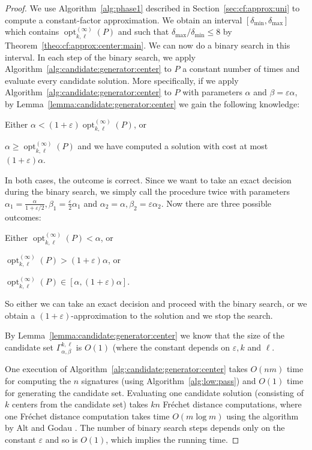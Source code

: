 \documentclass[11pt, letter]{article}
\DeclareMathOperator{\opt}{opt}
\newcommand{\secref}[1]{Section~\ref{sec:#1}}
\newcommand{\thmref}[1]{Theorem~\ref{theo:#1}}
\newcommand{\lemref}[1]{Lemma~\ref{lemma:#1}}
\newcommand{\algref}[1]{Algorithm~\ref{alg:#1}}
\newcommand{\Frechet}{Fr\'echet\xspace}
\providecommand{\eps}{{\varepsilon}}\newcommand{\Astop}{\overline{a}}
\newcommand{\nrClusters}{\ensuremath{k}}
\newcommand{\lenClusters}{\ensuremath{\ell}}
\begin{document}
\begin{proof}
We use 
\algref{phase1}
described in \secref{cf:approx:uni} to compute a
constant-factor approximation.  We obtain an interval
$[\delta_{\min},\delta_{\max}]$ which contains
$\opt^{(\infty)}_{\nrClusters,\lenClusters}(P)$ and such that
$\delta_{\max}/\delta_{\min}\leq 8$ by \thmref{cf:approx:center:main}.
We can now do a binary search in this interval.  
In each step of the binary
search, we apply \algref{candidate:generator:center} to $P$ a constant number
of times and evaluate every candidate solution. 
More specifically, if we apply \algref{candidate:generator:center} to $P$ with parameters
$\alpha$ and $\beta=\eps\alpha$, 
by \lemref{candidate:generator:center}
we gain the following knowledge:
\begin{compactenum}[(i)]
\item Either $\alpha < (1+\eps)\opt^{(\infty)}_{\nrClusters,\lenClusters}(P)$, or
\item $\alpha \geq \opt^{(\infty)}_{\nrClusters,\lenClusters}(P)$ and 
we have computed a solution with cost at most $(1+\eps)\alpha$.
\end{compactenum}
In both cases, the outcome is correct. Since we want to take an exact decision 
during the binary search, we simply call the procedure twice with 
parameters $\alpha_1=\frac{\alpha}{1+\eps/2},\beta_1=\frac{\eps}{2}\alpha_1$ and
$\alpha_2=\alpha,\beta_2=\eps\alpha_2$. 
Now there are three possible outcomes:
\begin{compactenum}[(i)]
\item Either $\opt^{(\infty)}_{\nrClusters,\lenClusters}(P) < \alpha$, or
\item $\opt^{(\infty)}_{\nrClusters,\lenClusters}(P) > (1+\eps)\alpha$, or
\item $\opt^{(\infty)}_{\nrClusters,\lenClusters}(P) \in [\alpha,(1+\eps)\alpha]$.
\end{compactenum} 
So either we can take an exact decision and proceed with the
binary search, or we obtain a $(1+\eps)$-approximation to the solution and we
stop the search.



By \lemref{candidate:generator:center} we know that the size of the
candidate set $\Gamma^{\nrClusters,\lenClusters}_{\alpha,\beta}$ is $O(1)$
(where the constant depends on $\eps, \nrClusters$ and $\lenClusters$.

One execution of \algref{candidate:generator:center} takes $O(nm)$ time for
computing the $n$ signatures (using \algref{low:pass}) and 
$O(1)$ time for generating the candidate set.
Evaluating one candidate solution (consisting of $k$ centers from the candidate set) 
takes $kn$ \Frechet distance computations, where one
\Frechet distance computation takes time $O(m \log m)$
using the algorithm by Alt and Godau
\cite{ag-cfdbt-95}.  The number of binary search steps depends only on the constant
$\eps$ and so is $O(1)$, which implies the running time.
\end{proof}
\end{document}
